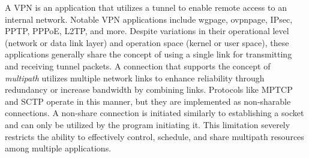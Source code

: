 A \ac{VPN} is an application that utilizes a tunnel to enable remote access to an internal network. 
Notable \ac{VPN} applications include \ac{wgpage}, \ac{ovpnpage}, IPsec, PPTP, PPPoE, L2TP, and more. 
Despite variations in their operational level (network or data link layer) and operation space (kernel or user space), these applications generally share the concept of using a single link for transmitting and receiving tunnel packets.
A connection that supports the concept of \textit{multipath} utilizes multiple network links to enhance reliability through redundancy or increase bandwidth by combining links. 
Protocols like \ac{MPTCP} and \ac{SCTP} operate in this manner, but they are implemented as non-sharable connections.
A non-share connection is initiated similarly to establishing a socket and can only be utilized by the program initiating it. This limitation severely restricts the ability to effectively control, schedule, and share multipath resources among multiple applications. 
